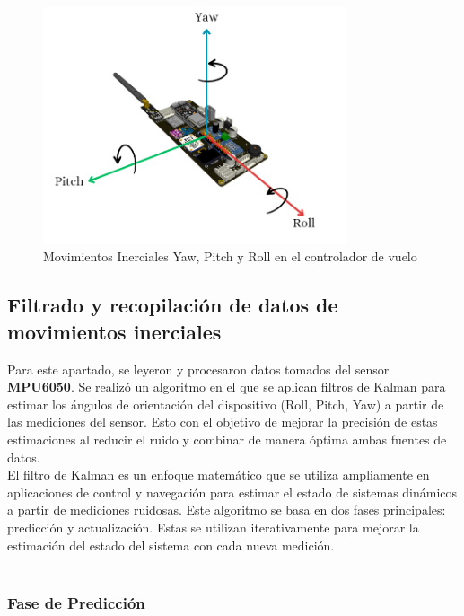         \begin{figure}[H]
            \centering
            \includegraphics[width=0.8\textwidth]{Imagenes/Metodologia/pcb_yaw_pitch_roll.png}
            \caption{Movimientos Inerciales Yaw, Pitch y Roll en el controlador de vuelo}
            \label{fig:movimientos_inerciales}
        \end{figure}

    \subsection{ Filtrado y recopilación de datos de movimientos inerciales}
        Para este apartado, se leyeron y procesaron datos tomados del sensor \textbf{MPU6050}. Se realizó un algoritmo en el que se aplican filtros de Kalman para estimar los ángulos de orientación del dispositivo (Roll, Pitch, Yaw) a partir de las mediciones del sensor. Esto con el objetivo de mejorar la precisión de estas estimaciones al reducir el ruido y combinar de manera óptima ambas fuentes de datos. \\ 

        El filtro de Kalman es un enfoque matemático que se utiliza ampliamente en aplicaciones de control y navegación para estimar el estado de sistemas dinámicos a partir de mediciones ruidosas. Este algoritmo se basa en dos fases principales: predicción y actualización. Estas se utilizan iterativamente para mejorar la estimación del estado del sistema con cada nueva medición.
        \\ \\


    \subsubsection{Fase de Predicción}

